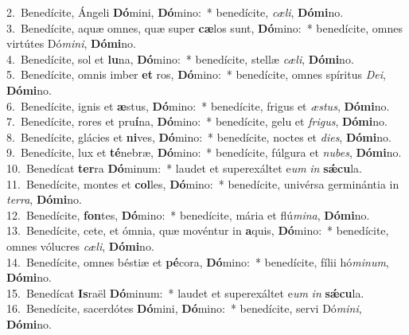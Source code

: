 {2.~}Benedícite, Ángeli \textbf{Dó}mini, \textbf{Dó}mino:~* benedícite, \textit{cæ}\textit{li}, \textbf{Dó}\textbf{mi}no.\\
{3.~}Benedícite, aquæ omnes, quæ super \textbf{cæ}los sunt, \textbf{Dó}mino:~* benedícite, omnes virtútes Dó\textit{mi}\textit{ni}, \textbf{Dó}\textbf{mi}no.\\
{4.~}Benedícite, sol et \textbf{lu}na, \textbf{Dó}mino:~* benedícite, stellæ \textit{cæ}\textit{li}, \textbf{Dó}\textbf{mi}no.\\
{5.~}Benedícite, omnis imber \textbf{et} ros, \textbf{Dó}mino:~* benedícite, omnes spíritus \textit{De}\textit{i}, \textbf{Dó}\textbf{mi}no.\\
{6.~}Benedícite, ignis et \textbf{æ}stus, \textbf{Dó}mino:~* benedícite, frigus et \textit{æ}\textit{stus}, \textbf{Dó}\textbf{mi}no.\\
{7.~}Benedícite, rores et pru\textbf{í}na, \textbf{Dó}mino:~* benedícite, gelu et \textit{fri}\textit{gus}, \textbf{Dó}\textbf{mi}no.\\
{8.~}Benedícite, glácies et \textbf{ni}ves, \textbf{Dó}mino:~* benedícite, noctes et \textit{di}\textit{es}, \textbf{Dó}\textbf{mi}no.\\
{9.~}Benedícite, lux et \textbf{té}nebræ, \textbf{Dó}mino:~* benedícite, fúlgura et \textit{nu}\textit{bes}, \textbf{Dó}\textbf{mi}no.\\
{10.~}Benedícat \textbf{ter}ra \textbf{Dó}minum:~* laudet et superexáltet e\textit{um} \textit{in} \textbf{sǽ}\textbf{cu}la.\\
{11.~}Benedícite, montes et \textbf{col}les, \textbf{Dó}mino:~* benedícite, univérsa germinántia in \textit{ter}\textit{ra}, \textbf{Dó}\textbf{mi}no.\\
{12.~}Benedícite, \textbf{fon}tes, \textbf{Dó}mino:~* benedícite, mária et flú\textit{mi}\textit{na}, \textbf{Dó}\textbf{mi}no.\\
{13.~}Benedícite, cete, et ómnia, quæ movéntur in \textbf{a}quis, \textbf{Dó}mino:~* benedícite, omnes vólucres \textit{cæ}\textit{li}, \textbf{Dó}\textbf{mi}no.\\
{14.~}Benedícite, omnes béstiæ et \textbf{pé}cora, \textbf{Dó}mino:~* benedícite, fílii hó\textit{mi}\textit{num}, \textbf{Dó}\textbf{mi}no.\\
{15.~}Benedícat \textbf{Is}raël \textbf{Dó}minum:~* laudet et superexáltet e\textit{um} \textit{in} \textbf{sǽ}\textbf{cu}la.\\
{16.~}Benedícite, sacerdótes \textbf{Dó}mini, \textbf{Dó}mino:~* benedícite, servi Dó\textit{mi}\textit{ni}, \textbf{Dó}\textbf{mi}no.\\
